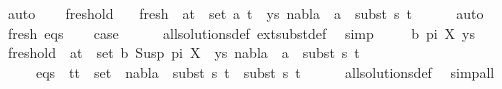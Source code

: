 \begin{isabellebody}
\ auto\isanewline
\ \ \isamarkupfalse%
\ fresh{\isacharunderscore}{\kern0pt}old\ \isamarkupfalse%
\isanewline
\ \ fresh{\isacharcolon}{\kern0pt}\ {\isachardoublequoteopen}{\isasymforall}\ {\isacharparenleft}{\kern0pt}a{\isacharcomma}{\kern0pt}t{\isacharprime}{\kern0pt}{\isacharparenright}{\kern0pt}\ {\isasymin}\ set\ {\isacharparenleft}{\kern0pt}{\isacharparenleft}{\kern0pt}a{\isacharcomma}{\kern0pt}\ t{\isacharparenright}{\kern0pt}\ {\isacharhash}{\kern0pt}\ ys{\isacharparenright}{\kern0pt}{\isachardot}{\kern0pt}\ nabla{}\ {\isasymturnstile}\ a\ {\isasymsharp}\ subst\ s{}\ t{\isacharprime}{\kern0pt}{\isachardoublequoteclose}\isanewline
\ \ \ \ \isamarkupfalse%
\ auto\isanewline
\ \ \isamarkupfalse%
\ fresh\ eqs\isanewline
\ \ \isamarkupfalse%
\ {\isacharquery}{\kern0pt}case\isanewline
\ \ \ \ \isamarkupfalse%
\ all{\isacharunderscore}{\kern0pt}solutions{\isacharunderscore}{\kern0pt}def\ ext{\isacharunderscore}{\kern0pt}subst{\isacharunderscore}{\kern0pt}def\ \isamarkupfalse%
\ simp\isanewline
{}\isamarkupfalse%
\isanewline
\ \ \isamarkupfalse%
\ {\isacharparenleft}{\kern0pt}{}\ b\ pi\ X\ ys{\isacharparenright}{\kern0pt}\isanewline
\ \ \isamarkupfalse%
\ fresh{\isacharunderscore}{\kern0pt}old{\isacharcolon}{\kern0pt}\ {\isachardoublequoteopen}{\isasymforall}\ {\isacharparenleft}{\kern0pt}a{\isacharcomma}{\kern0pt}t{\isacharparenright}{\kern0pt}\ {\isasymin}\ set\ {\isacharparenleft}{\kern0pt}{\isacharparenleft}{\kern0pt}b{\isacharcomma}{\kern0pt}\ Susp\ pi\ X{\isacharparenright}{\kern0pt}\ {\isacharhash}{\kern0pt}\ ys{\isacharparenright}{\kern0pt}{\isachardot}{\kern0pt}\ nabla{}\ {\isasymturnstile}\ a\ {\isasymsharp}\ subst\ s{}\ t{\isachardoublequoteclose}\isanewline
\ \ \ \ \ eqs{\isacharcolon}{\kern0pt}\ {\isachardoublequoteopen}{\isasymforall}\ {\isacharparenleft}{\kern0pt}t{}{\isacharcomma}{\kern0pt}t{}{\isacharparenright}{\kern0pt}\ {\isasymin}\ set\ {\isacharbrackleft}{\kern0pt}{\isacharbrackright}{\kern0pt}{\isachardot}{\kern0pt}\ nabla{}\ {\isasymturnstile}\ subst\ s{}\ t{}\ {\isasymapprox}\ subst\ s{}\ t{}{\isachardoublequoteclose}\isanewline
\ \ \ \ \isamarkupfalse%
\ all{\isacharunderscore}{\kern0pt}solutions{\isacharunderscore}{\kern0pt}def\ \isamarkupfalse%
\ simp{\isacharunderscore}{\kern0pt}all\isanewline

\end{isabellebody}

